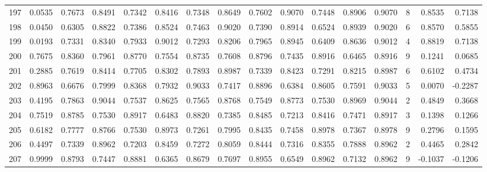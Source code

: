 \begin{tabular}{lrrrrrrrrrrrrrrr}
197 &      0.0535 &  0.7673 &  0.8491 &  0.7342 &  0.8416 &  0.7348 &  0.8649 &  0.7602 &  0.9070 &  0.7448 &   0.8906 &     0.9070 &      8 &                    0.8535 &                     0.7138 \\
198 &      0.0450 &  0.6305 &  0.8822 &  0.7386 &  0.8524 &  0.7463 &  0.9020 &  0.7390 &  0.8914 &  0.6524 &   0.8939 &     0.9020 &      6 &                    0.8570 &                     0.5855 \\
199 &      0.0193 &  0.7331 &  0.8340 &  0.7933 &  0.9012 &  0.7293 &  0.8206 &  0.7965 &  0.8945 &  0.6409 &   0.8636 &     0.9012 &      4 &                    0.8819 &                     0.7138 \\
200 &      0.7675 &  0.8360 &  0.7961 &  0.8770 &  0.7554 &  0.8735 &  0.7608 &  0.8796 &  0.7435 &  0.8916 &   0.6465 &     0.8916 &      9 &                    0.1241 &                     0.0685 \\
201 &      0.2885 &  0.7619 &  0.8414 &  0.7705 &  0.8302 &  0.7893 &  0.8987 &  0.7339 &  0.8423 &  0.7291 &   0.8215 &     0.8987 &      6 &                    0.6102 &                     0.4734 \\
202 &      0.8963 &  0.6676 &  0.7999 &  0.8368 &  0.7932 &  0.9033 &  0.7417 &  0.8896 &  0.6384 &  0.8605 &   0.7591 &     0.9033 &      5 &                    0.0070 &                    -0.2287 \\
203 &      0.4195 &  0.7863 &  0.9044 &  0.7537 &  0.8625 &  0.7565 &  0.8768 &  0.7549 &  0.8773 &  0.7530 &   0.8969 &     0.9044 &      2 &                    0.4849 &                     0.3668 \\
204 &      0.7519 &  0.8785 &  0.7530 &  0.8917 &  0.6483 &  0.8820 &  0.7385 &  0.8485 &  0.7213 &  0.8416 &   0.7471 &     0.8917 &      3 &                    0.1398 &                     0.1266 \\
205 &      0.6182 &  0.7777 &  0.8766 &  0.7530 &  0.8973 &  0.7261 &  0.7995 &  0.8435 &  0.7458 &  0.8978 &   0.7367 &     0.8978 &      9 &                    0.2796 &                     0.1595 \\
206 &      0.4497 &  0.7339 &  0.8962 &  0.7203 &  0.8459 &  0.7272 &  0.8059 &  0.8444 &  0.7316 &  0.8355 &   0.7888 &     0.8962 &      2 &                    0.4465 &                     0.2842 \\
207 &      0.9999 &  0.8793 &  0.7447 &  0.8881 &  0.6365 &  0.8679 &  0.7697 &  0.8955 &  0.6549 &  0.8962 &   0.7132 &     0.8962 &      9 &                   -0.1037 &                    -0.1206 \\

\end{tabular}
